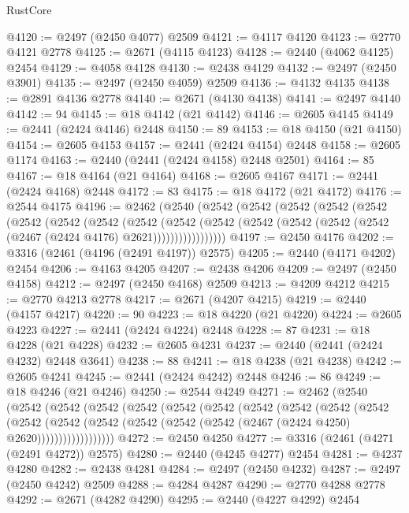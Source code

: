\begin{lexlean}{RustCore}
\begin{coremodule}
@4120 := @2497 (@2450 @4077) @2509
@4121 := @4117 @4120
@4123 := @2770 @4121 @2778
@4125 := @2671 (@4115 @4123)
@4128 := @2440 (@4062 @4125) @2454
@4129 := @4058 @4128
@4130 := @2438 @4129
@4132 := @2497 (@2450 @3901)
@4135 := @2497 (@2450 @4059) @2509
@4136 := @4132 @4135
@4138 := @2891 @4136 @2778
@4140 := @2671 (@4130 @4138)
@4141 := @2497 @4140
@4142 := 94
@4145 := @18 @4142 (@21 @4142)
@4146 := @2605 @4145
@4149 := @2441 (@2424 @4146) @2448
@4150 := 89
@4153 := @18 @4150 (@21 @4150)
@4154 := @2605 @4153
@4157 := @2441 (@2424 @4154) @2448
@4158 := @2605 @1174
@4163 := @2440 (@2441 (@2424 @4158) @2448 @2501)
@4164 := 85
@4167 := @18 @4164 (@21 @4164)
@4168 := @2605 @4167
@4171 := @2441 (@2424 @4168) @2448
@4172 := 83
@4175 := @18 @4172 (@21 @4172)
@4176 := @2544 @4175
@4196 := @2462
    (@2540
      (@2542
        (@2542
          (@2542
            (@2542
              (@2542
                (@2542
                  (@2542
                    (@2542
                      (@2542
                        (@2542
                          (@2542
                            (@2542 (@2542 (@2542 (@2542 (@2467 (@2424 @4176) @2621)))))))))))))))))
@4197 := @2450 @4176
@4202 := @3316 (@2461 (@4196 (@2491 @4197)) @2575)
@4205 := @2440 (@4171 @4202) @2454
@4206 := @4163 @4205
@4207 := @2438 @4206
@4209 := @2497 (@2450 @4158)
@4212 := @2497 (@2450 @4168) @2509
@4213 := @4209 @4212
@4215 := @2770 @4213 @2778
@4217 := @2671 (@4207 @4215)
@4219 := @2440 (@4157 @4217)
@4220 := 90
@4223 := @18 @4220 (@21 @4220)
@4224 := @2605 @4223
@4227 := @2441 (@2424 @4224) @2448
@4228 := 87
@4231 := @18 @4228 (@21 @4228)
@4232 := @2605 @4231
@4237 := @2440 (@2441 (@2424 @4232) @2448 @3641)
@4238 := 88
@4241 := @18 @4238 (@21 @4238)
@4242 := @2605 @4241
@4245 := @2441 (@2424 @4242) @2448
@4246 := 86
@4249 := @18 @4246 (@21 @4246)
@4250 := @2544 @4249
@4271 := @2462
    (@2540
      (@2542
        (@2542
          (@2542
            (@2542
              (@2542
                (@2542
                  (@2542
                    (@2542
                      (@2542
                        (@2542
                          (@2542
                            (@2542
                              (@2542
                                (@2542 (@2542 (@2542 (@2467 (@2424 @4250) @2620))))))))))))))))))
@4272 := @2450 @4250
@4277 := @3316 (@2461 (@4271 (@2491 @4272)) @2575)
@4280 := @2440 (@4245 @4277) @2454
@4281 := @4237 @4280
@4282 := @2438 @4281
@4284 := @2497 (@2450 @4232)
@4287 := @2497 (@2450 @4242) @2509
@4288 := @4284 @4287
@4290 := @2770 @4288 @2778
@4292 := @2671 (@4282 @4290)
@4295 := @2440 (@4227 @4292) @2454

\end{coremodule}
\end{lexlean}
